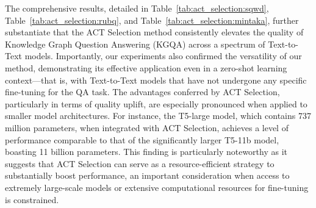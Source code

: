 The comprehensive results, detailed in Table~\ref{tab:act_selection:sqwd}, Table~\ref{tab:act_selection:rubq}, and Table~\ref{tab:act_selection:mintaka}, further substantiate that the ACT Selection method consistently elevates the quality of Knowledge Graph Question Answering (KGQA) across a spectrum of Text-to-Text models. Importantly, our experiments also confirmed the versatility of our method, demonstrating its effective application even in a zero-shot learning context—that is, with Text-to-Text models that have not undergone any specific fine-tuning for the QA task. The advantages conferred by ACT Selection, particularly in terms of quality uplift, are especially pronounced when applied to smaller model architectures. For instance, the T5-large model, which contains 737 million parameters, when integrated with ACT Selection, achieves a level of performance comparable to that of the significantly larger T5-11b model, boasting 11 billion parameters. This finding is particularly noteworthy as it suggests that ACT Selection can serve as a resource-efficient strategy to substantially boost performance, an important consideration when access to extremely large-scale models or extensive computational resources for fine-tuning is constrained.


    
